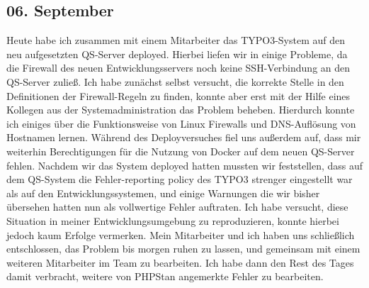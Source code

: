 \subsection{06. September}
Heute habe ich zusammen mit einem Mitarbeiter das TYPO3-System auf den neu aufgesetzten QS-Server deployed. Hierbei liefen wir in einige Probleme, da die Firewall des neuen Entwicklungsservers noch keine SSH-Verbindung an den QS-Server zuließ. Ich habe zunächst selbst versucht, die korrekte Stelle in den Definitionen der Firewall-Regeln zu finden, konnte aber erst mit der Hilfe eines Kollegen aus der Systemadministration das Problem beheben. Hierdurch konnte ich einiges über die Funktionsweise von Linux Firewalls und DNS-Auflösung von Hostnamen lernen. Während des Deployversuches fiel uns außerdem auf, dass mir weiterhin Berechtigungen für die Nutzung von Docker auf dem neuen QS-Server fehlen.
Nachdem wir das System deployed hatten mussten wir feststellen, dass auf dem QS-System die Fehler-reporting policy des TYPO3 strenger eingestellt war als auf den Entwicklungssystemen, und einige Warnungen die wir bisher übersehen hatten nun als vollwertige Fehler auftraten. Ich habe versucht, diese Situation in meiner Entwicklungsumgebung zu reproduzieren, konnte hierbei jedoch kaum Erfolge vermerken. Mein Mitarbeiter und ich haben uns schließlich entschlossen, das Problem bis morgen ruhen zu lassen, und gemeinsam mit einem weiteren Mitarbeiter im Team zu bearbeiten. Ich habe dann den Rest des Tages damit verbracht, weitere von PHPStan angemerkte Fehler zu bearbeiten.